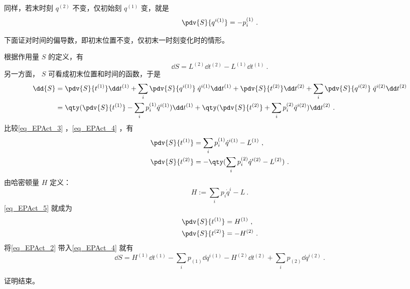 同样，若末时刻 $q^{(2)}$ 不变，仅初始刻 $q^{(1)}$ 变，就是
\begin{equation}
\pdv{S}{{q}^{i (1)}}=-p_i^{(1)}~.
\end{equation}

下面证对时间的偏导数，即初末位置不变，仅初末一时刻变化时的情形。

根据作用量 $S$ 的定义，有
\begin{equation}\label{eq_EPAct_3}
\dd{S}=L^{(2)}\dd t^{(2)}-L^{(1)}\dd t^{(1)}~.
\end{equation}
另一方面， $S$ 可看成初末位置和时间的函数，于是
\begin{equation}\label{eq_EPAct_4}
\begin{aligned}
\dd{S}&=\pdv{S}{t^{(1)}}\dd t^{(1)}+\sum_i\pdv{S}{{q}^{i (1)}}\;{\dot q}^{i (1)}\dd t^{(1)}+\pdv{S}{t^{(2)}}\dd t^{(2)}+\sum_i\pdv{S}{{q}^{i (2)}}\; {\dot q}^{i (2)}\dd t^{(2)} \\
&=\qty(\pdv{S}{t^{(1)}}-\sum_i p_i^{(1)} {\dot q}^{i (1)})\dd t^{(1)}+\qty(\pdv{S}{t^{(2)}}+\sum_i p_i^{(2)}{\dot q}^{i (2)})\dd t^{(2)}~.
\end{aligned}
\end{equation}
比较\autoref{eq_EPAct_3} ，\autoref{eq_EPAct_4} ，有
\begin{equation}\label{eq_EPAct_5}
\begin{aligned}
\pdv{S}{t^{(1)}}&=\sum_i p_i^{(1)}{\dot q}^{i (1)}-L^{(1)}~,\\
\pdv{S}{t^{(2)}}&=-\qty(\sum_i p_i^{(2)}{\dot q}^{i (2)}-L^{(2)})~.
\end{aligned}
\end{equation}
由哈密顿量 $H$ 定义：
\begin{equation}
H:=\sum_i p_i {\dot q^i}-L~.
\end{equation}
\autoref{eq_EPAct_5} 就成为
\begin{equation}\label{eq_EPAct_2}
\begin{aligned}
\pdv{S}{t^{(1)}}&=H^{(1)}~,\\
\pdv{S}{t^{(2)}}&=-H^{(2)}~.
\end{aligned}
\end{equation}
将\autoref{eq_EPAct_2} 带入\autoref{eq_EPAct_4} 就有
\begin{equation}
\dd{S}=H^{(1)}\dd t^{(1)}-\sum_ip_{(1)}\dd {q}^{i (1)}-H^{(2)}\dd t^{(2)}+\sum_i p_{(2)}\dd {q}^{i (2)}~.
\end{equation}

证明结束。
